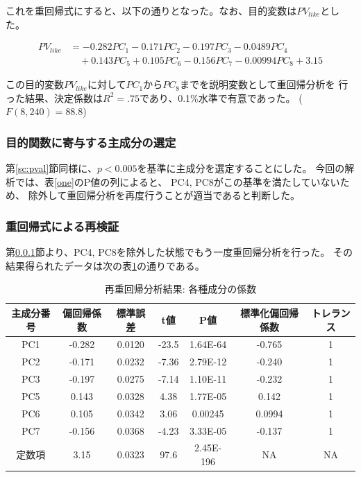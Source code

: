 \documentclass[11pt,a4paper, uplatex]{jsarticle}
\begin{document}
これを重回帰式にすると、以下の通りとなった。なお、目的変数は$ PV_{like} $とした。

\begin{equation}
  \begin{split}
    PV_{like} &= -0.282PC_1 - 0.171PC_2 - 0.197PC_3 - 0.0489PC_4 \\
    &\quad + 0.143PC_5 + 0.105PC_6 - 0.156PC_7 - 0.00994PC_8 + 3.15
  \end{split}
\end{equation}

この目的変数$ PV_{like} $に対して$ PC_1 $から$ PC_8 $までを説明変数として重回帰分析を
行った結果、決定係数は$ R^2 = .75 $であり、0.1\%水準で有意であった。
($ F(8, 240) = 88.8 $)

\subsubsection{目的関数に寄与する主成分の選定}
\label{onesec}

第\ref{sc:pval}節同様に、$ p < 0.005 $を基準に主成分を選定することにした。
今回の解析では、表\ref{one}のP値の列によると、
PC4, PC8がこの基準を満たしていないため、
除外して重回帰分析を再度行うことが適当であると判断した。

\subsubsection{重回帰式による再検証}
第\ref{onesec}節より、PC4, PC8を除外した状態でもう一度重回帰分析を行った。
その結果得られたデータは次の表\ref{two}の通りである。

\begin{table}[htbp]
  \begin{center}
    \caption{再重回帰分析結果: 各種成分の係数}
    \begin{tabular}{c|c|c|c|c|c|c}
      \hline
      主成分番号 & 偏回帰係数 & 標準誤差 & t値 & P値 & 標準化偏回帰係数 & トレランス \\ \hline \hline
      PC1 & -0.282 & 0.0120 & -23.5 & 1.64E-64 & -0.765 & 1 \\
      PC2 & -0.171 & 0.0232 & -7.36 & 2.79E-12 & -0.240 & 1 \\
      PC3 & -0.197 & 0.0275 & -7.14 & 1.10E-11 & -0.232 & 1 \\
      PC5 & 0.143 & 0.0328 & 4.38 & 1.77E-05 & 0.142 & 1 \\
      PC6 & 0.105 & 0.0342 & 3.06 & 0.00245 & 0.0994 & 1 \\
      PC7 & -0.156 & 0.0368 & -4.23 & 3.33E-05 & -0.137 & 1 \\
      定数項 & 3.15 & 0.0323 & 97.6 & 2.45E-196 & NA & NA \\
    \end{tabular}
    \label{two}
  \end{center}
\end{table}
\end{document}
